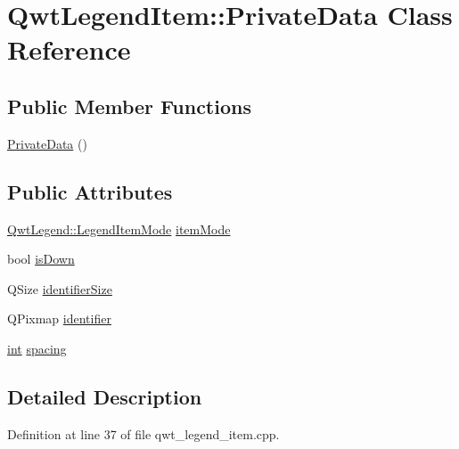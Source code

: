 \hypertarget{class_qwt_legend_item_1_1_private_data}{\section{Qwt\-Legend\-Item\-:\-:Private\-Data Class Reference}
\label{class_qwt_legend_item_1_1_private_data}
}
\subsection*{Public Member Functions}
\begin{DoxyCompactItemize}
\item 
\hyperlink{class_qwt_legend_item_1_1_private_data_a4c33ec9821ac5a031d384e8d80d2386e}{Private\-Data} ()
\end{DoxyCompactItemize}
\subsection*{Public Attributes}
\begin{DoxyCompactItemize}
\item 
\hyperlink{class_qwt_legend_ab216dd2dba9ebf6cb0ed2dd621a652e0}{Qwt\-Legend\-::\-Legend\-Item\-Mode} \hyperlink{class_qwt_legend_item_1_1_private_data_a307ed22bad69cf577a3dd2412cb17490}{item\-Mode}
\item 
bool \hyperlink{class_qwt_legend_item_1_1_private_data_a09c3f53bf03eb09411c0ca4c521bfa57}{is\-Down}
\item 
Q\-Size \hyperlink{class_qwt_legend_item_1_1_private_data_aaa287233b16063ec74e6d3b1627a7044}{identifier\-Size}
\item 
Q\-Pixmap \hyperlink{class_qwt_legend_item_1_1_private_data_a5222f16bd91e12b47e5cf13c38352830}{identifier}
\item 
\hyperlink{ioapi_8h_a787fa3cf048117ba7123753c1e74fcd6}{int} \hyperlink{class_qwt_legend_item_1_1_private_data_aa874d4c42203a7c092be4dc3412ba546}{spacing}
\end{DoxyCompactItemize}


\subsection{Detailed Description}


Definition at line 37 of file qwt\-\_\-legend\-\_\-item.\-cpp.




